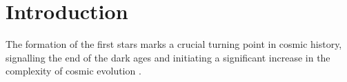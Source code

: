 \section{Introduction}
\label{intro}

The formation of the first stars marks a crucial turning point in cosmic history, signalling the end of the dark ages and initiating a significant increase in the complexity of cosmic evolution \citep{BarkanaLoeb2001, Miralda-Escude2003, Brommetal2009, Loeb2010}.
